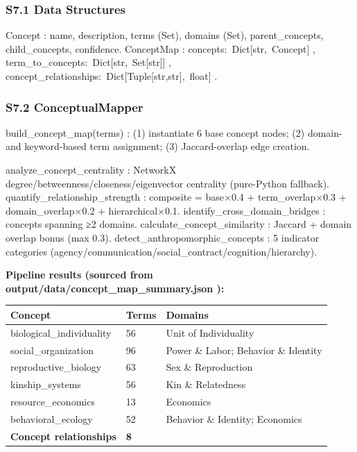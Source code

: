 \documentclass[
]{article}
\newcounter{none} %
\numberwithin{equation}{section}
\renewcommand{\texttt}[1]{%
    \colorbox{codebg}{\color{codefg}\ttfamily #1}%
}
\begin{document}
\subsubsection{S7.1 Data Structures}\label{s7.1-data-structures}

\texttt{Concept}: name, description, terms (Set), domains (Set),
parent\_concepts, child\_concepts, confidence. \texttt{ConceptMap}:
\texttt{concepts:\ Dict{[}str,\ Concept{]}},
\texttt{term\_to\_concepts:\ Dict{[}str,\ Set{[}str{]}{]}},
\texttt{concept\_relationships:\ Dict{[}Tuple{[}str,str{]},\ float{]}}.

\subsubsection{\texorpdfstring{S7.2
\texttt{ConceptualMapper}}{S7.2 ConceptualMapper}}\label{s7.2-conceptualmapper}

\texttt{build\_concept\_map(terms)}: (1) instantiate 6 base concept
nodes; (2) domain- and keyword-based term assignment; (3)
Jaccard-overlap edge creation.

\texttt{analyze\_concept\_centrality}: NetworkX
degree/betweenness/closeness/eigenvector centrality (pure-Python
fallback). \texttt{quantify\_relationship\_strength}: composite =
base×0.4 + term\_overlap×0.3 + domain\_overlap×0.2 + hierarchical×0.1.
\texttt{identify\_cross\_domain\_bridges}: concepts spanning ≥2 domains.
\texttt{calculate\_concept\_similarity}: Jaccard + domain overlap bonus
(max 0.3). \texttt{detect\_anthropomorphic\_concepts}: 5 indicator
categories (agency/communication/social\_contract/cognition/hierarchy).

\textbf{Pipeline results (sourced from
\texttt{output/data/concept\_map\_summary.json}):}

{\def\LTcaptype{none} %
\begin{longtable}[]{@{}lll@{}}
\toprule\noalign{}
Concept & Terms & Domains \\
\midrule\noalign{}
\endhead
\bottomrule\noalign{}
\endlastfoot
\texttt{biological\_individuality} & 56 & Unit of Individuality \\
\texttt{social\_organization} & 96 & Power \& Labor; Behavior \&
Identity \\
\texttt{reproductive\_biology} & 63 & Sex \& Reproduction \\
\texttt{kinship\_systems} & 56 & Kin \& Relatedness \\
\texttt{resource\_economics} & 13 & Economics \\
\texttt{behavioral\_ecology} & 52 & Behavior \& Identity; Economics \\
\textbf{Concept relationships} & \textbf{8} & \\
\end{longtable}
}
\end{document}
